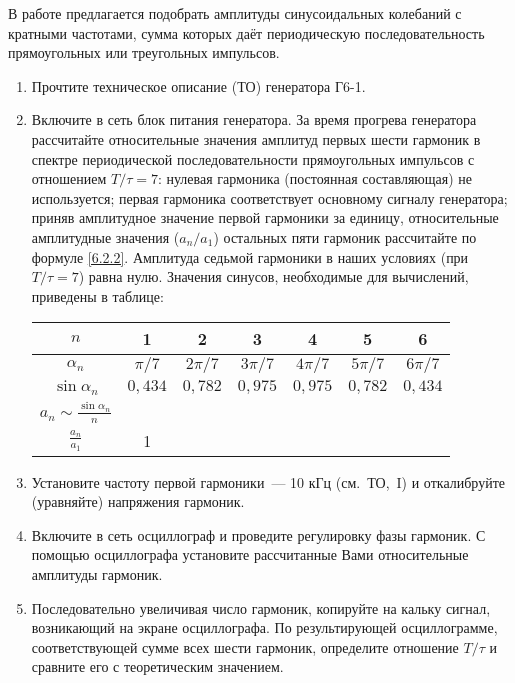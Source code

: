\begin{lab:task}

В работе предлагается подобрать амплитуды синусоидальных колебаний с кратными частотами, сумма которых даёт
периодическую последовательность прямоугольных или треугольных импульсов.


\begin{enumerate}
	\item Прочтите техническое описание (ТО) генератора Г6-1.
	\item\label{task} Включите в сеть блок питания генератора. За время прогрева генератора рассчитайте относительные значения амплитуд первых шести гармоник в спектре периодической последовательности прямоугольных импульсов с отношением $T/\tau=7$: нулевая гармоника (постоянная составляющая) не используется; первая гармоника соответствует основному сигналу генератора; приняв амплитудное значение первой гармоники за единицу, относительные амплитудные значения ($a_n/a_1$) остальных пяти гармоник рассчитайте по формуле \eqref{6.2.2}. Амплитуда седьмой гармоники в наших условиях (при $T/\tau=7$) равна нулю. Значения синусов, необходимые для вычислений, приведены в таблице:

\begin{center}
\begin{tabular}{|c|c|c|c|c|c|c|} \hline
$n$ & 1 & 2 & 3 & 4 & 5 & 6 \\ \hline $\alpha_n$&$\pi /7$&$2\pi /7$&$3\pi /7$&$4\pi /7$&$5\pi /7$& $6\pi /7$ \\ \hline
$\sin \alpha_n$ & $0{,}434$ & $0{,}782$ & $0{,}975$ & $0{,}975$ &$0{,}782$ & $0{,}434$ \\ \hline $a_n\sim\frac{\sin
\alpha_n}{n}$& & & & & & \\ \hline $\frac{a_n}{a_1}$&1& & & & & \\ \hline
\end{tabular}
\end{center}

	\item Установите частоту первой гармоники~--- 10 кГц (см.~ТО,~I) и откалибруйте (уравняйте) напряжения гармоник.
	\item Включите в сеть осциллограф и проведите регулировку фазы гармоник. С помощью осциллографа установите рассчитанные Вами относительные амплитуды гармоник.
	\item Последовательно увеличивая число гармоник, копируйте на кальку сигнал, возникающий на экране осциллографа. По результирующей осциллограмме, соответствующей сумме всех шести гармоник, определите отношение $T/\tau$ и сравните его с теоретическим значением.
\end{enumerate}


\end{lab:task}
